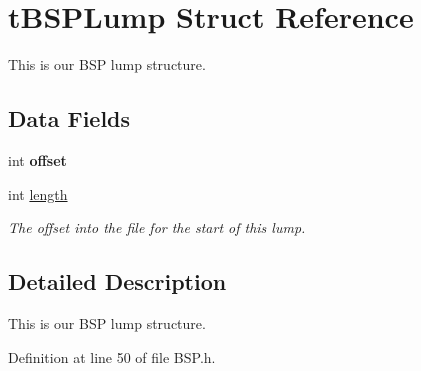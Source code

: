 \hypertarget{structt_b_s_p_lump}{}\section{t\+B\+S\+P\+Lump Struct Reference}
\label{structt_b_s_p_lump}


This is our B\+SP lump structure.  


\subsection*{Data Fields}
\begin{DoxyCompactItemize}
\item 
int {\bfseries offset}\hypertarget{structt_b_s_p_lump_a5867754b7d8b7e35b82185d099579226}{}\label{structt_b_s_p_lump_a5867754b7d8b7e35b82185d099579226}

\item 
int \hyperlink{structt_b_s_p_lump_afbc7425ba859229dba1872f143087407}{length}\hypertarget{structt_b_s_p_lump_afbc7425ba859229dba1872f143087407}{}\label{structt_b_s_p_lump_afbc7425ba859229dba1872f143087407}

\begin{DoxyCompactList}\small\item\em The offset into the file for the start of this lump. \end{DoxyCompactList}\end{DoxyCompactItemize}


\subsection{Detailed Description}
This is our B\+SP lump structure. 

Definition at line 50 of file B\+S\+P.\+h.

